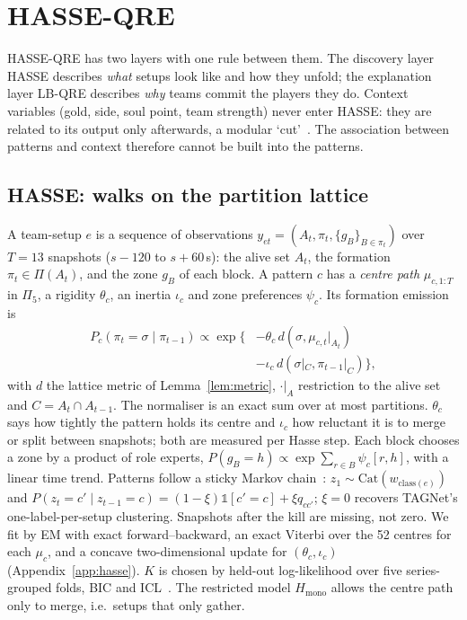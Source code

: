 \section{HASSE-QRE}
\label{sec:model}

HASSE-QRE has two layers with one rule between them.
The discovery layer HASSE describes \emph{what} setups look like and how they unfold; the explanation layer LB-QRE describes \emph{why} teams commit the players they do.
Context variables (gold, side, soul point, team strength) never enter HASSE: they are related to its output only afterwards, a modular `cut'~\cite{plummer2015cuts}.
The association between patterns and context therefore cannot be built into the patterns.

\subsection{HASSE: walks on the partition lattice}

A team-setup $e$ is a sequence of observations $y_{et}=(A_t,\pi_t,\{g_B\}_{B\in\pi_t})$ over $T=13$ snapshots ($s{-}120$ to $s{+}60$\,s): the alive set $A_t$, the formation $\pi_t\in\Pi(A_t)$, and the zone $g_B$ of each block.
A pattern $c$ has a \emph{centre path} $\mu_{c,1:T}$ in $\Pi_5$, a rigidity $\theta_c$, an inertia $\iota_c$ and zone preferences $\psi_c$.
Its formation emission is
\begin{equation}
\begin{split}
P_c(\pi_t=\sigma\mid\pi_{t-1})\propto\exp\{&-\theta_c\, d(\sigma,\mu_{c,t}|_{A_t})\\
&-\iota_c\, d(\sigma|_C,\pi_{t-1}|_C)\},
\end{split}
\label{eq:hasse}
\end{equation}
with $d$ the lattice metric of Lemma~\ref{lem:metric}, $\cdot|_A$ restriction to the alive set and $C=A_t\cap A_{t-1}$.
The normaliser is an exact sum over at most  partitions.
$\theta_c$ says how tightly the pattern holds its centre and $\iota_c$ how reluctant it is to merge or split between snapshots; both are measured per Hasse step.
Each block chooses a zone by a product of role experts, $P(g_B=h)\propto\exp\sum_{r\in B}\psi_c[r,h]$, with a linear time trend.
Patterns follow a sticky Markov chain~\cite{fox2011sticky}: $z_1\sim\mathrm{Cat}(w_{\mathrm{class}(e)})$ and $P(z_t=c'\mid z_{t-1}=c)=(1-\xi)\mathbb{1}[c'=c]+\xi q_{cc'}$; $\xi=0$ recovers TAGNet's one-label-per-setup clustering.
Snapshots after the kill are missing, not zero.
We fit by EM with exact forward--backward, an exact Viterbi over the 52 centres for each $\mu_c$, and a concave two-dimensional update for $(\theta_c,\iota_c)$ (Appendix~\ref{app:hasse}).
$K$ is chosen by held-out log-likelihood over five series-grouped folds, BIC and ICL~\cite{biernacki2000assessing}.
The restricted model $H_{\mathrm{mono}}$ allows the centre path only to merge, i.e.\ setups that only gather.

